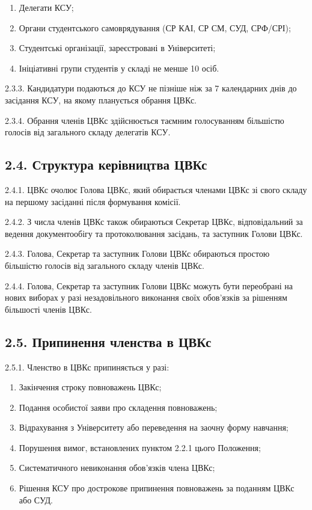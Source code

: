         \begin{enumerate}[label=\alph*)]
            \item Делегати КСУ;
            \item Органи студентського самоврядування (СР КАІ, СР СМ, СУД, СРФ/СРІ);
            \item Студентські організації, зареєстровані в Університеті;
            \item Ініціативні групи студентів у складі не менше 10 осіб.
        \end{enumerate}

    2.3.3. Кандидатури подаються до КСУ не пізніше ніж за 7 календарних днів до засідання КСУ, на якому планується обрання ЦВКс.

    2.3.4. Обрання членів ЦВКс здійснюється таємним голосуванням більшістю голосів від загального складу делегатів КСУ.

\subsection*{2.4. Структура керівництва ЦВКс}
    2.4.1. ЦВКс очолює Голова ЦВКс, який обирається членами ЦВКс зі свого складу на першому засіданні після формування комісії.

    2.4.2. З числа членів ЦВКс також обираються Секретар ЦВКс, відповідальний за ведення документообігу та протоколювання засідань, та заступник Голови ЦВКс.

    2.4.3. Голова, Секретар та заступник Голови ЦВКс обираються простою більшістю голосів від загального складу членів ЦВКс.

    2.4.4. Голова, Секретар та заступник Голови ЦВКс можуть бути переобрані на нових виборах у разі незадовільного виконання своїх обов'язків за рішенням більшості членів ЦВКс.

\subsection*{2.5. Припинення членства в ЦВКс}
    2.5.1. Членство в ЦВКс припиняється у разі:

        \begin{enumerate}[label=\alph*)]
            \item Закінчення строку повноважень ЦВКс;
            \item Подання особистої заяви про складення повноважень;
            \item Відрахування з Університету або переведення на заочну форму навчання;
            \item Порушення вимог, встановлених пунктом 2.2.1 цього Положення;
            \item Систематичного невиконання обов'язків члена ЦВКс;
            \item Рішення КСУ про дострокове припинення повноважень за поданням ЦВКс або СУД.
        \end{enumerate}

